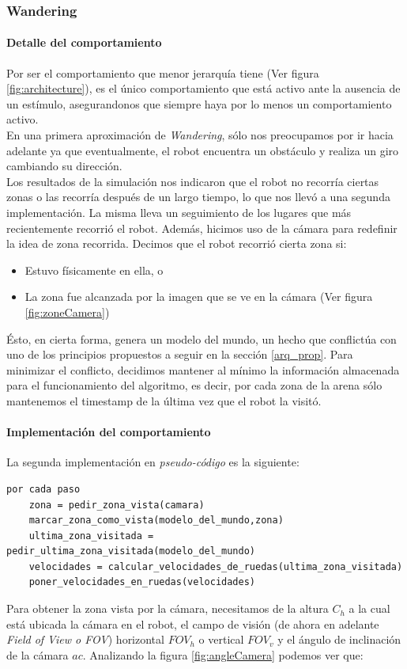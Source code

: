\subsubsection{Wandering}
\label{wandering}

\paragraph{Detalle del comportamiento} 
Por ser el comportamiento que menor jerarqu\'ia tiene (Ver figura
\ref{fig:architecture}), es el \'unico comportamiento que est\'a activo
ante la ausencia de un est\'imulo, asegurandonos que siempre haya por lo menos
un comportamiento activo.
\\\indent
En una primera aproximaci\'on de \emph{Wandering}, s\'olo nos preocupamos por
ir hacia adelante ya que eventualmente, el robot encuentra un obst\'aculo y
realiza un giro cambiando su direcci\'on.
\\\indent
Los resultados de la simulaci\'on nos indicaron que el robot no recorr\'ia
ciertas zonas o las recorr\'ia despu\'es de un largo tiempo, lo que nos llev\'o
a una segunda implementaci\'on. La misma lleva un seguimiento de los
lugares que m\'as recientemente recorri\'o el robot. Adem\'as, hicimos uso de la
c\'amara para redefinir la idea de zona recorrida. Decimos que el robot
recorri\'o cierta zona si:
\begin{itemize}
	\item{}Estuvo f\'isicamente en ella, o
	\item{}La zona fue alcanzada por la imagen que se ve en la c\'amara
			(Ver figura \ref{fig:zoneCamera})
\end{itemize}
\'Esto, en cierta forma, genera un modelo del mundo, un hecho que
conflict\'ua con uno de los principios propuestos a seguir en la secci\'on
\ref{arq_prop}. Para minimizar el conflicto, decidimos mantener al m\'inimo la
informaci\'on almacenada para el funcionamiento del algoritmo, es decir, por
cada zona de la arena s\'olo mantenemos el timestamp de la \'ultima vez que el
robot la visit\'o.

\paragraph{Implementaci\'on del comportamiento}

La segunda implementaci\'on en \emph{pseudo-c\'odigo} es la siguiente:
\begin{verbatim}
por cada paso
    zona = pedir_zona_vista(camara)
    marcar_zona_como_vista(modelo_del_mundo,zona)
    ultima_zona_visitada = pedir_ultima_zona_visitada(modelo_del_mundo)
    velocidades = calcular_velocidades_de_ruedas(ultima_zona_visitada)
    poner_velocidades_en_ruedas(velocidades)
\end{verbatim}
Para obtener la zona vista por la c\'amara, necesitamos de la altura $C_h$ a la
cual est\'a ubicada la c\'amara en el robot, el campo de visi\'on (de ahora en
adelante \emph{Field of View o FOV}) horizontal $FOV_h$ o vertical $FOV_v$ y
el \'angulo de inclinaci\'on de la c\'amara $ac$. Analizando la figura 
\ref{fig:angleCamera} podemos ver que:

